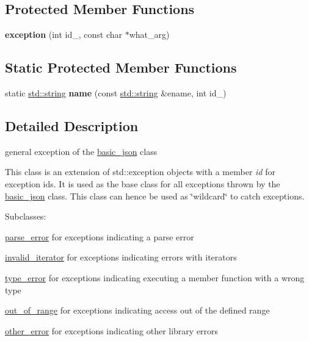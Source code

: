 \subsection*{Protected Member Functions}
\begin{DoxyCompactItemize}
\item 
\mbox{\label{classnlohmann_1_1detail_1_1exception_ae323ad0d53bc724414c2233164e65657}} 
{\bfseries exception} (int id\+\_\+, const char $\ast$what\+\_\+arg)
\end{DoxyCompactItemize}
\subsection*{Static Protected Member Functions}
\begin{DoxyCompactItemize}
\item 
\mbox{\label{classnlohmann_1_1detail_1_1exception_abf41a7e9178356314082284e6cfea278}} 
static \hyperlink{namespacenlohmann_1_1detail_a90aa5ef615aa8305e9ea20d8a947980fab45cffe084dd3d20d928bee85e7b0f21}{std\+::string} {\bfseries name} (const \hyperlink{namespacenlohmann_1_1detail_a90aa5ef615aa8305e9ea20d8a947980fab45cffe084dd3d20d928bee85e7b0f21}{std\+::string} \&ename, int id\+\_\+)
\end{DoxyCompactItemize}


\subsection{Detailed Description}
general exception of the \hyperlink{classnlohmann_1_1basic__json}{basic\+\_\+json} class 

This class is an extension of {\ttfamily std\+::exception} objects with a member {\itshape id} for exception ids. It is used as the base class for all exceptions thrown by the \hyperlink{classnlohmann_1_1basic__json}{basic\+\_\+json} class. This class can hence be used as \char`\"{}wildcard\char`\"{} to catch exceptions.

Subclasses\+:
\begin{DoxyItemize}
\item \hyperlink{classnlohmann_1_1detail_1_1parse__error}{parse\+\_\+error} for exceptions indicating a parse error
\item \hyperlink{classnlohmann_1_1detail_1_1invalid__iterator}{invalid\+\_\+iterator} for exceptions indicating errors with iterators
\item \hyperlink{classnlohmann_1_1detail_1_1type__error}{type\+\_\+error} for exceptions indicating executing a member function with a wrong type
\item \hyperlink{classnlohmann_1_1detail_1_1out__of__range}{out\+\_\+of\+\_\+range} for exceptions indicating access out of the defined range
\item \hyperlink{classnlohmann_1_1detail_1_1other__error}{other\+\_\+error} for exceptions indicating other library errors
\end{DoxyItemize}

